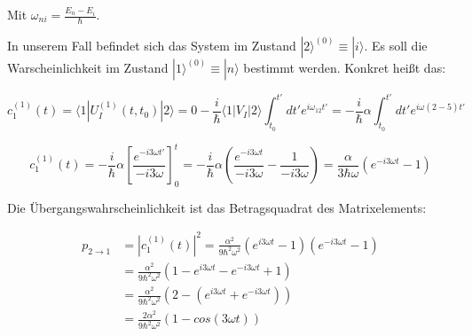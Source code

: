 Mit \(\omega_{ni} =\frac{E_n-E_i}{\hbar} \). 

In unserem Fall befindet sich das System im Zustand \(|2\rangle^{(0)} \equiv |i\rangle  \). Es soll die Warscheinlichkeit im Zustand \(|1\rangle^{(0)} \equiv |n\rangle  \) bestimmt werden. Konkret heißt das:

\[ c_1^{(1)}(t) =  \langle 1| U_I^{(1)}(t,t_0)|2\rangle = 0 - \frac{i}{\hbar}\langle 1|V_I  |2\rangle \int_{t_0}^{t'} dt' e^{i\omega_{12}t'} = - \frac{i}{\hbar}\alpha  \int_{t_0}^{t'} dt' e^{i\omega(2-5)t'}\]

\[ c_1^{(1)}(t) =  - \frac{i}{\hbar}\alpha   \left[\frac{e^{-i3\omega t'}}{-i3\omega}\right]^{t}_{0} = - \frac{i}{\hbar}\alpha (\frac{e^{-i3\omega t}}{-i3\omega}-\frac{1}{-i3\omega}) = \frac{\alpha}{3\hbar\omega} (e^{-i3\omega t}-1) \]

Die Übergangswahrscheinlichkeit ist das Betragsquadrat des Matrixelements:

\begin{align} 
p_{2 \to 1} &= |c_1^{(1)}(t)|^2 = \frac{\alpha^2}{9\hbar^2\omega^2} (e^{i3\omega t}-1)(e^{-i3\omega t}-1) \\
&= \frac{\alpha^2}{9\hbar^2\omega^2} (1-e^{i3\omega t}-e^{-i3\omega t}+1) \\
&= \frac{\alpha^2}{9\hbar^2\omega^2} (2-(e^{i3\omega t}+e^{-i3\omega t})) \\
&= \frac{2\alpha^2}{9\hbar^2\omega^2} (1-cos(3\omega t))
\end{align}

 



